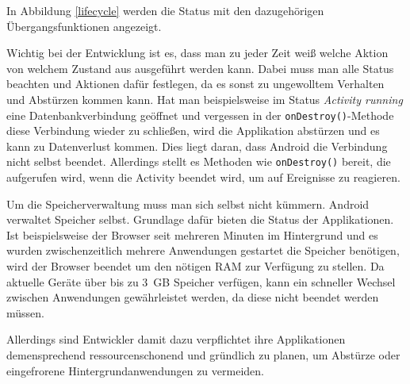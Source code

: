 In Abbildung \ref{lifecycle} werden die Status mit den dazugehörigen Übergangsfunktionen angezeigt.

Wichtig bei der Entwicklung ist es, dass man zu jeder Zeit weiß welche Aktion von welchem Zustand aus ausgeführt werden kann. Dabei muss man alle Status beachten und Aktionen dafür festlegen, da es sonst zu ungewolltem Verhalten und Abstürzen kommen kann. Hat man beispielsweise im Status \emph{Activity running} eine Datenbankverbindung geöffnet und vergessen in der \verb+onDestroy()+-Methode diese Verbindung wieder zu schließen, wird die Applikation abstürzen und es kann zu Datenverlust kommen. Dies liegt daran, dass Android die Verbindung nicht selbst beendet. Allerdings stellt es Methoden wie \verb+onDestroy()+ bereit, die aufgerufen wird, wenn die Activity beendet wird, um auf Ereignisse zu reagieren.

Um die Speicherverwaltung muss man sich selbst nicht kümmern. Android verwaltet Speicher selbst. Grundlage dafür bieten die Status der Applikationen. Ist beispielsweise der Browser seit mehreren Minuten im Hintergrund und es wurden zwischenzeitlich mehrere Anwendungen gestartet die Speicher benötigen, wird der Browser beendet um den nötigen RAM zur Verfügung zu stellen. Da aktuelle Geräte über bis zu \SI{3}{GB} Speicher verfügen, kann ein schneller Wechsel zwischen Anwendungen gewährleistet werden, da diese nicht beendet werden müssen.

Allerdings sind Entwickler damit dazu verpflichtet ihre Applikationen demensprechend ressourcenschonend und gründlich zu planen, um Abstürze oder eingefrorene Hintergrundanwendungen zu vermeiden.